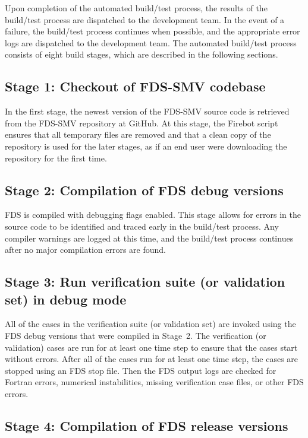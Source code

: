 \documentclass[11pt]{book}
\begin{document}
Upon completion of the automated build/test process, the results of the build/test process are dispatched to the development team. In the event of a failure, the build/test process continues when possible, and the appropriate error logs are dispatched to the development team. The automated build/test process consists of eight build stages, which are described in the following sections.

\subsection*{Stage 1: Checkout of FDS-SMV codebase}

In the first stage, the newest version of the FDS-SMV source code is retrieved from the FDS-SMV repository at GitHub. At this stage, the Firebot script ensures that all temporary files are removed and that a clean copy of the repository is used for the later stages, as if an end user were downloading the repository for the first time.

\subsection*{Stage 2: Compilation of FDS debug versions}

FDS is compiled with debugging flags enabled. This stage allows for errors in the source code to be identified and traced early in the build/test process. Any compiler warnings are logged at this time, and the build/test process continues after no major compilation errors are found.

\subsection*{Stage 3: Run verification suite (or validation set) in debug mode}

All of the cases in the verification suite (or validation set) are invoked using the FDS debug versions that were compiled in Stage~2. The verification (or validation) cases are run for at least one time step to ensure that the cases start without errors. After all of the cases run for at least one time step, the cases are stopped using an FDS stop file. Then the FDS output logs are checked for Fortran errors, numerical instabilities, missing verification case files, or other FDS errors.

\subsection*{Stage 4: Compilation of FDS release versions}
\end{document}
